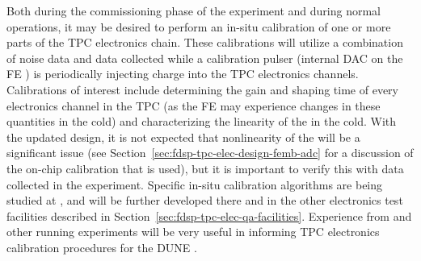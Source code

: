 Both during the commissioning phase of the experiment and during normal operations, it may
be desired to perform an in-situ calibration of one or more parts of the TPC electronics chain.
These calibrations will utilize a combination of noise data and data collected while a
calibration pulser (internal DAC on the FE ) is periodically injecting charge into the TPC
electronics channels.  Calibrations of interest include determining the gain and shaping time of
every electronics channel in the TPC (as the FE  may experience changes in these quantities
in the cold) and characterizing the linearity of the   in the cold.  With the updated  
design, it is not expected that nonlinearity of the  will be a significant issue (see
Section~\ref{sec:fdsp-tpc-elec-design-femb-adc} for a discussion of the on-chip calibration
that is used), but it is important to verify this with data collected in the experiment.
Specific in-situ calibration algorithms are being studied at , and will be further
developed there and in the other electronics test facilities described in
Section~\ref{sec:fdsp-tpc-elec-qa-facilities}.  Experience from \microboone and other running
\lartpc experiments will be very useful in informing TPC electronics calibration procedures for
the DUNE .
